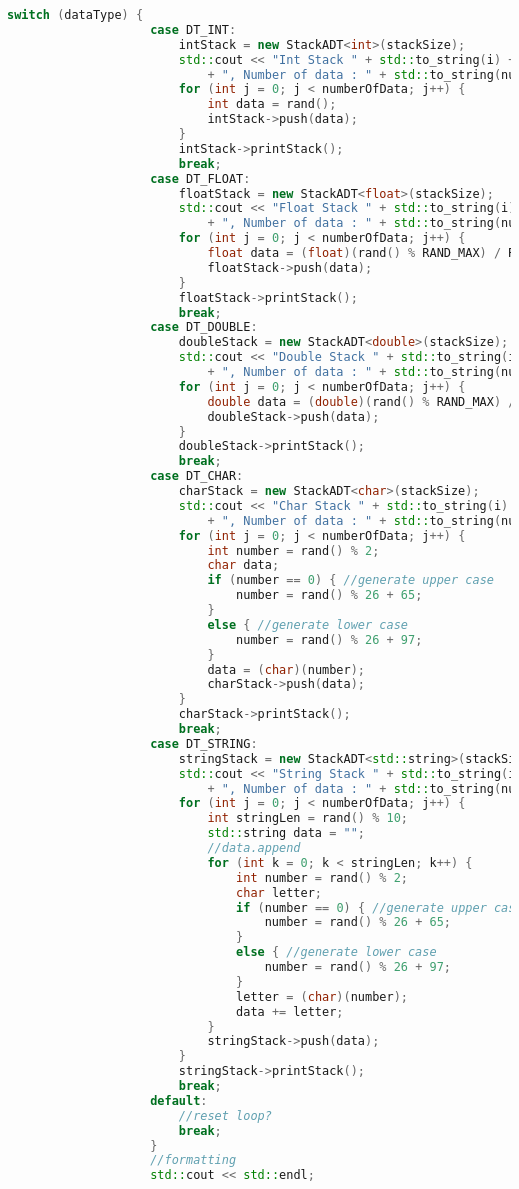 \documentclass{report}
\begin{document}
\begin{lstlisting}[language=C++]
					switch (dataType) {
					case DT_INT:
						intStack = new StackADT<int>(stackSize);
						std::cout << "Int Stack " + std::to_string(i) + ", Max Stack Size : " + std::to_string(stackSize)
							+ ", Number of data : " + std::to_string(numberOfData) << std::endl;
						for (int j = 0; j < numberOfData; j++) {
							int data = rand();
							intStack->push(data);
						}
						intStack->printStack();
						break;
					case DT_FLOAT:
						floatStack = new StackADT<float>(stackSize);
						std::cout << "Float Stack " + std::to_string(i) + ", Max Stack Size : " + std::to_string(stackSize)
							+ ", Number of data : " + std::to_string(numberOfData) << std::endl;
						for (int j = 0; j < numberOfData; j++) {
							float data = (float)(rand() % RAND_MAX) / RAND_MAX;
							floatStack->push(data);
						}
						floatStack->printStack();
						break;
					case DT_DOUBLE:
						doubleStack = new StackADT<double>(stackSize);
						std::cout << "Double Stack " + std::to_string(i) + ", Max Stack Size : " + std::to_string(stackSize)
							+ ", Number of data : " + std::to_string(numberOfData) << std::endl;
						for (int j = 0; j < numberOfData; j++) {
							double data = (double)(rand() % RAND_MAX) / RAND_MAX;
							doubleStack->push(data);
						}
						doubleStack->printStack();
						break;
					case DT_CHAR:
						charStack = new StackADT<char>(stackSize);
						std::cout << "Char Stack " + std::to_string(i) + ", Max Stack Size : " + std::to_string(stackSize)
							+ ", Number of data : " + std::to_string(numberOfData) << std::endl;
						for (int j = 0; j < numberOfData; j++) {
							int number = rand() % 2;
							char data;
							if (number == 0) { //generate upper case
								number = rand() % 26 + 65;
							}
							else { //generate lower case
								number = rand() % 26 + 97;
							}
							data = (char)(number);
							charStack->push(data);
						}
						charStack->printStack();
						break;
					case DT_STRING:
						stringStack = new StackADT<std::string>(stackSize);
						std::cout << "String Stack " + std::to_string(i) + ", Max Stack Size : " + std::to_string(stackSize)
							+ ", Number of data : " + std::to_string(numberOfData) << std::endl;
						for (int j = 0; j < numberOfData; j++) {
							int stringLen = rand() % 10;
							std::string data = "";
							//data.append
							for (int k = 0; k < stringLen; k++) {
								int number = rand() % 2;
								char letter;
								if (number == 0) { //generate upper case
									number = rand() % 26 + 65;
								}
								else { //generate lower case
									number = rand() % 26 + 97;
								}
								letter = (char)(number);
								data += letter;
							}
							stringStack->push(data);
						}
						stringStack->printStack();
						break;
					default:
						//reset loop?
						break;
					}
					//formatting
					std::cout << std::endl;


\end{lstlisting}
\end{document}
